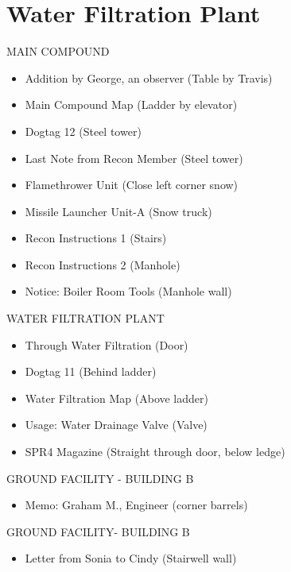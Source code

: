 \chapter{Water Filtration Plant}

\begin{subregion}{MAIN COMPOUND}
    \begin{itemize}
        \item Addition by George, an observer (Table by Travis)
        \item Main Compound Map (Ladder by elevator)
        \item Dogtag 12 (Steel tower)
        \item Last Note from Recon Member (Steel tower)
        \item Flamethrower Unit (Close left corner snow)
        \item Missile Launcher Unit-A (Snow truck)
        \item Recon Instructions 1 (Stairs)
        \item Recon Instructions 2 (Manhole)
        \item Notice: Boiler Room Tools (Manhole wall)
    \end{itemize}
\end{subregion}

\begin{subregion}{WATER FILTRATION PLANT}
    \begin{itemize}
        \item Through Water Filtration (Door)
        \item Dogtag 11 (Behind ladder)
        \item Water Filtration Map (Above ladder)
        \item Usage: Water Drainage Valve (Valve)
        \item SPR4 Magazine (Straight through door, below ledge)
    \end{itemize}
\end{subregion}

\begin{subregion}{GROUND FACILITY - BUILDING B}
    \begin{itemize}
        \item Memo: Graham M., Engineer (corner barrels)
    \end{itemize}
\end{subregion}

\begin{subregion}{GROUND FACILITY- BUILDING B}
    \begin{itemize}
        \item Letter from Sonia to Cindy (Stairwell wall)
    \end{itemize}
\end{subregion}


